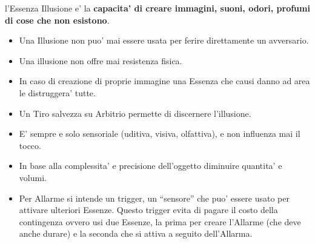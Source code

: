 \documentclass[a4paper,11pt,twoside,openany]{dndbook}
\begin{document}
\label{essenza-illusione---magnetismo}

l'Essenza Illusione e' la \textbf{capacita' di creare immagini, suoni,
odori, profumi di cose che non esistono}.
\begin{itemize}
\item 
Una Illusione non puo' mai essere usata per ferire direttamente un avversario. 
\item 
Una illusione non offre mai resistenza fisica. 
\item 
In caso di creazione di proprie immagine una Essenza che causi danno ad area le distruggera' tutte. 
\item 
Un Tiro salvezza su Arbitrio permette di discernere l'illusione. 
\item 
E' sempre e solo sensoriale (uditiva, visiva, olfattiva), e non influenza mai il tocco. 
\item 
In base alla complessita' e precisione dell'oggetto diminuire quantita' e volumi. 
\item 
Per Allarme si intende un trigger, un ``sensore'' che puo' essere usato per attivare ulteriori Essenze. Questo trigger evita di pagare il costo della contingenza ovvero usi due Essenze, la prima per creare l'Allarme (che deve anche durare) e la seconda che si attiva a seguito
dell'Allarma. 
\end{itemize}

\bigskip
\end{document}
